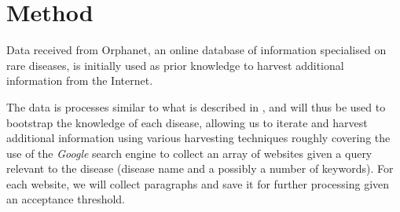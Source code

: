 \documentclass[10pt,letterpaper,final]{article}
\begin{document}










\section{Method}
\label{chap:method}
Data received from Orphanet, an online database of information
specialised on rare diseases, is initially used as prior knowledge to
harvest additional information from the Internet.




The data is processes similar to what is described in
\cite{jensenandersen}, and will thus be used to bootstrap the knowledge
of each disease, allowing us to iterate and harvest additional
information using various harvesting techniques roughly covering the use
of the \textit{Google} search engine to collect an array of websites
given a query relevant to the disease (disease name and a possibly a
number of keywords). For each website, we will collect paragraphs and
save it for further processing given an acceptance threshold.
\end{document}
